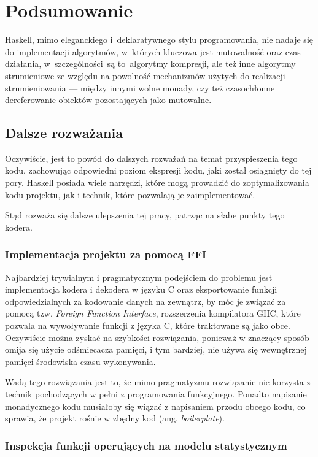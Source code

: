 \documentclass[../../thesis.tex]{subfiles}
\begin{document}
\chapter{Podsumowanie}

Haskell, mimo eleganckiego i~deklaratywnego stylu programowania,
nie nadaje się do implementacji algorytmów, w~których kluczowa
jest mutowalność oraz czas działania, w~szczególności~są to~algorytmy
kompresji, ale też inne algorytmy strumieniowe ze względu na powolność
mechanizmów użytych do realizacji strumieniowania --- między innymi
wolne monady, czy też czasochłonne dereferowanie obiektów pozostających
jako mutowalne. 

\section{Dalsze rozważania}

Oczywiście, jest to powód do dalszych rozważań na temat przyspieszenia
tego kodu, zachowując odpowiedni poziom ekspresji kodu, jaki został
osiągnięty do tej pory. Haskell posiada wiele narzędzi, które mogą
prowadzić do zoptymalizowania kodu projektu, jak i technik, które
pozwalają je zaimplementować.

Stąd rozważa się dalsze ulepszenia tej pracy, patrząc na słabe punkty tego kodera.

\subsection{Implementacja projektu za pomocą FFI}

Najbardziej trywialnym i pragmatycznym podejściem do problemu jest
implementacja kodera i dekodera w języku C oraz eksportowanie funkcji
odpowiedzialnych za kodowanie danych na zewnątrz, by móc je związać
za pomocą tzw. \emph{Foreign Function Interface}, rozszerzenia kompilatora
GHC, które pozwala na wywoływanie funkcji z języka C, które traktowane 
są jako obce. Oczywiście można zyskać na szybkości rozwiązania,
ponieważ w znaczący sposób omija się użycie odśmiecacza pamięci,
i tym bardziej, nie używa się wewnętrznej pamięci środowiska
czasu wykonywania.

Wadą tego rozwiązania jest to, że mimo pragmatyzmu rozwiązanie nie korzysta
z technik pochodzących w pełni z programowania funkcyjnego.
Ponadto napisanie monadycznego kodu musiałoby się wiązać
z napisaniem przodu obcego kodu, co sprawia, że projekt
rośnie w zbędny kod (ang. \emph{boilerplate}).

\subsection{Inspekcja funkcji operujących na modelu statystycznym}
\end{document}
